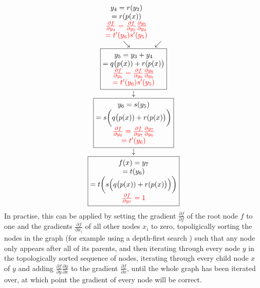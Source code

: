 \begin{equation*}
\begin{matrix}
\begin{matrix}
{\begin{matrix}
                y_4=r(y_2) \\
                =r(p(x)) \\
                \color{red}{\frac{\partial f}{\partial y_4} = \frac{\partial f}{\partial y_5}\frac{\partial y_5}{\partial y_4}} \\
                \color{red}{= t'(y_6)s'(y_5)}
            \end{matrix}} \\
            \searrow & \swarrow \\
        \end{matrix} \\
        \boxed{\begin{matrix}
            y_5 = y_3+y_4 \\
            = q\bigl(p(x)) + r(p(x)\bigr) \\
            \color{red}{\frac{\partial f}{\partial y_5} = \frac{\partial f}{\partial y_6}\frac{\partial y_6}{\partial y_5}} \\
            \color{red}{= t'(y_6)s'(y_5)}
        \end{matrix}} \\
        \downarrow \\
        \boxed{\begin{matrix}
            y_6 = s(y_5) \\
            = s\biggl(q\bigl(p(x)) + r(p(x)\bigr)\biggr) \\
            \color{red}{\frac{\partial f}{\partial y_6} = \frac{\partial f}{\partial y_7}\frac{\partial y_7}{\partial y_6}} \\
            \color{red}{= t'(y_6)}
        \end{matrix}} \\
        \downarrow \\
        \boxed{\begin{matrix}
            f(x) = y_7 \\
            = t(y_6) \\
            = t\biggl(s\Bigl(q\bigl(p(x)) + r(p(x)\bigr)\Bigr)\biggr) \\
            \color{red}{\frac{\partial f}{\partial y_7} = 1}
        \end{matrix}}
    \end{matrix}
\end{equation*}
In practise, this can be applied by setting the gradient $\frac{\partial f}{\partial f}$ of the root node $f$ to one and the gradients $\frac{\partial f}{\partial x_i}$ of all other nodes $x_i$ to zero, topoligically sorting the nodes in the graph (for example using a depth-first search \cite{cormen2001section}) such that any node only appears after all of its parents, and then iterating through every node $y$ in the topologically sorted sequence of nodes, iterating through every child node $x$ of $y$ and adding $\frac{\partial f}{\partial y}\frac{\partial y}{\partial x}$ to the gradient $\frac{\partial f}{\partial x}$, until the whole graph has been iterated over, at which point the gradient of every node will be correct.
